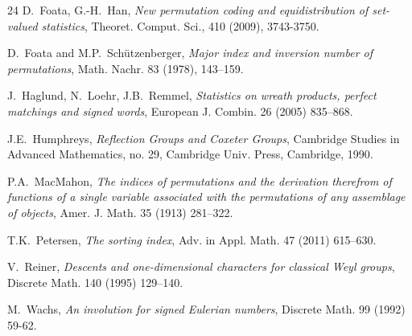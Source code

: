 \documentclass[a4paper, reqno, 11pt]{amsart}
\numberwithin{equation}{section}
\begin{document}
\begin{thebibliography}{24}
D.~Foata, G.-H.~Han, \emph{New permutation coding and equidistribution of set-valued statistics}, Theoret. Comput. Sci., 410 (2009), 3743-3750.

D.~Foata and M.P.~Sch\"{u}tzenberger, \emph{Major index and inversion number of permutations}, Math. Nachr. 83 (1978), 143--159.

J.~Haglund, N.~Loehr, J.B.~Remmel, \emph{Statistics on wreath products, perfect matchings and signed words}, European J. Combin. 26 (2005) 835--868.

J.E.~Humphreys, \emph{Reflection Groups and Coxeter Groups}, Cambridge Studies in Advanced Mathematics, no. 29, Cambridge Univ. Press, Cambridge, 1990.

P.A.~MacMahon, \emph{The indices of permutations and the derivation therefrom of functions of a single variable associated with the permutations of any assemblage of objects}, Amer. J. Math. 35 (1913) 281--322.

T.K.~Petersen, \emph{The sorting index}, Adv. in Appl. Math. 47 (2011) 615--630.

V.~Reiner, \emph{Descents and one-dimensional characters for classical Weyl groups}, Discrete Math. 140 (1995) 129--140.

M.~Wachs, \emph{An involution for signed Eulerian numbers}, Discrete Math. 99 (1992) 59-62.

\end{thebibliography}
\end{document}
